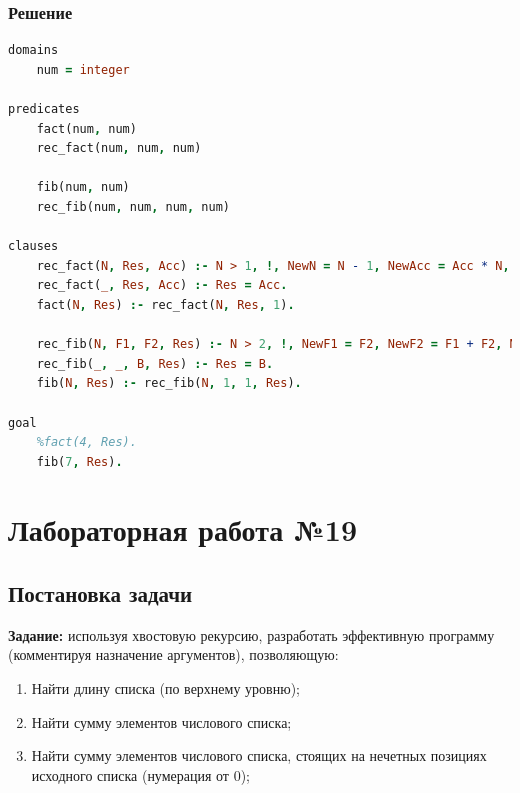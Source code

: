 \documentclass[12pt]{report}
\begin{document}
\subsection*{Решение}
\begin{lstlisting}[language=prolog]
domains
	num = integer

predicates
	fact(num, num)
	rec_fact(num, num, num)

	fib(num, num)
	rec_fib(num, num, num, num)

clauses
	rec_fact(N, Res, Acc) :- N > 1, !, NewN = N - 1, NewAcc = Acc * N, rec_fact(NewN, Res, NewAcc).
	rec_fact(_, Res, Acc) :- Res = Acc.
	fact(N, Res) :- rec_fact(N, Res, 1).
	
	rec_fib(N, F1, F2, Res) :- N > 2, !, NewF1 = F2, NewF2 = F1 + F2, NewN = N - 1, rec_fib(NewN, NewF1, NewF2, Res).
	rec_fib(_, _, B, Res) :- Res = B.
	fib(N, Res) :- rec_fib(N, 1, 1, Res).

goal
	%fact(4, Res).
	fib(7, Res).
\end{lstlisting}

\chapter*{Лабораторная работа №19}
\section*{Постановка задачи}

\textbf{Задание:} используя хвостовую рекурсию, разработать эффективную программу (комментируя назначение аргументов), позволяющую:
\begin{enumerate}
	\item Найти длину списка (по верхнему уровню);
	\item Найти сумму элементов числового списка;
	\item Найти сумму элементов числового списка, стоящих на нечетных позициях исходного списка (нумерация от 0);
\end{enumerate}
\end{document}
